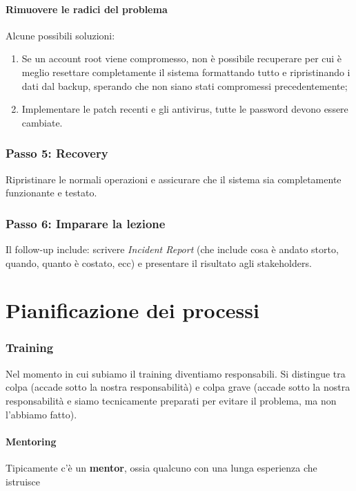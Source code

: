 \paragraph*{Rimuovere le radici del problema}

Alcune possibili soluzioni:
\begin{enumerate}
\item Se un account root viene compromesso, non è possibile recuperare per cui è
meglio resettare completamente il sistema formattando tutto e ripristinando i
dati dal backup, sperando che non siano stati compromessi precedentemente;
\item Implementare le patch recenti e gli antivirus, tutte le password devono
essere cambiate.
\end{enumerate}

\subsubsection{Passo 5: Recovery}

Ripristinare le normali operazioni e assicurare che il sistema sia completamente
funzionante e testato.

\subsubsection{Passo 6: Imparare la lezione}

Il follow-up include: scrivere \textit{Incident Report} (che include cosa è andato storto,
quando, quanto è costato, ecc) e presentare il risultato agli stakeholders.

\section{Pianificazione dei processi}
\label{IRBC:pp}

\subsubsection{Training}

Nel momento in cui subiamo il training diventiamo responsabili. Si distingue tra
colpa (accade sotto la nostra responsabilità) e colpa grave (accade sotto la
nostra responsabilità e siamo tecnicamente preparati per evitare il problema, ma
non l'abbiamo fatto).

\paragraph*{Mentoring} Tipicamente c'è un \textbf{mentor}, ossia qualcuno con
una lunga esperienza che istruisce

